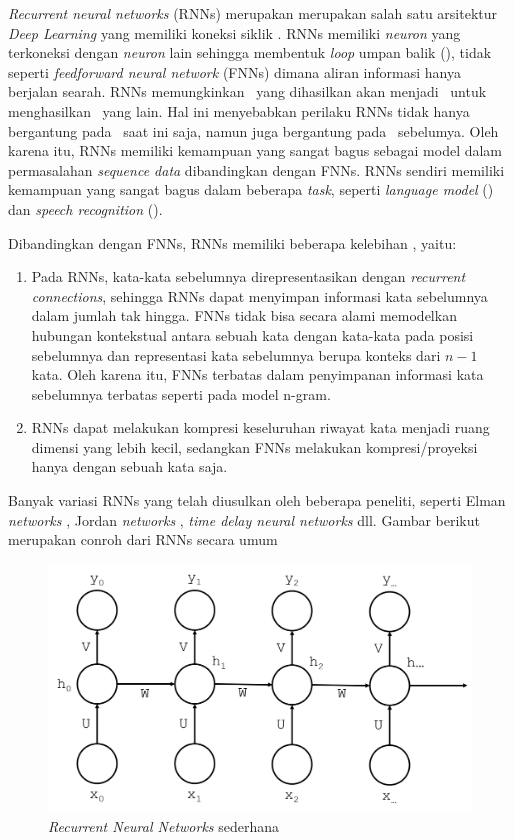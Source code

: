 \textit{Recurrent neural networks} (RNNs) merupakan merupakan salah satu arsitektur \textit{Deep Learning} yang memiliki koneksi siklik \citep{graves2012neural}. RNNs memiliki \textit{neuron} yang terkoneksi dengan \textit{neuron} lain sehingga membentuk \textit{loop} umpan balik (\cite{haykin2009neural}), tidak seperti \textit{feedforward neural network} (FNNs) dimana aliran informasi hanya berjalan searah. RNNs memungkinkan \iob~yang dihasilkan akan menjadi \ioa~untuk menghasilkan \iob~yang lain. Hal ini menyebabkan perilaku RNNs tidak hanya bergantung pada \ioa~saat ini saja, namun juga bergantung pada \iob~sebelumya. Oleh karena itu, RNNs memiliki kemampuan yang sangat bagus sebagai model dalam permasalahan \textit{sequence data} dibandingkan dengan FNNs. RNNs sendiri memiliki kemampuan yang sangat bagus dalam beberapa \textit{task}, seperti \textit{language model} (\cite{mikolov2010recurrent}) dan \textit{speech recognition} (\cite{graves2013speech}).

Dibandingkan dengan FNNs, RNNs memiliki beberapa kelebihan \citep{mikolov2010recurrent}, yaitu:
\begin{enumerate}
	\item Pada RNNs, kata-kata sebelumnya direpresentasikan dengan \textit{recurrent connections}, sehingga RNNs dapat menyimpan informasi kata sebelumnya dalam jumlah tak hingga. FNNs tidak bisa secara alami memodelkan hubungan kontekstual antara sebuah kata dengan kata-kata pada posisi sebelumnya dan representasi kata sebelumnya berupa konteks dari $ n-1 $ kata. Oleh karena itu, FNNs terbatas dalam penyimpanan informasi kata sebelumnya terbatas seperti pada model n-gram.
	\item RNNs dapat melakukan kompresi keseluruhan riwayat kata menjadi ruang dimensi yang lebih kecil, sedangkan FNNs melakukan kompresi/proyeksi hanya dengan sebuah kata saja.
\end{enumerate}

Banyak variasi RNNs yang telah diusulkan oleh beberapa peneliti, seperti Elman \textit{networks} \citep{elman1990finding}, Jordan \textit{networks} \citep{jordan1986attractor}, \textit{time delay neural networks} \citep{lang1990time} dll. Gambar berikut merupakan conroh  dari RNNs secara umum

\begin{figure}
	\centering
	\includegraphics[width=0.80\linewidth]{images/simple_rnn}
	\caption{\textit{Recurrent Neural Networks} sederhana}
	\label{fig:simple_rnn}
\end{figure}

